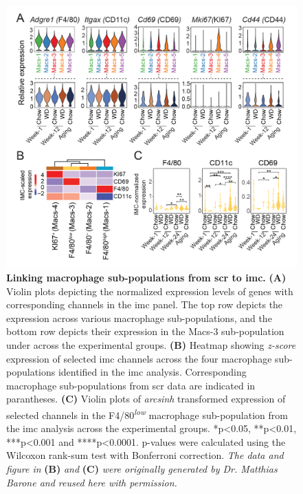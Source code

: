 \begin{figure}[t!]
\centering
\includegraphics[width=\linewidth]{Chapter4/Fig/F2-4-01.png}
\caption[Linking macrophage sub-populations from  to ]{\textbf{Linking macrophage sub-populations from \gls{scr} to \gls{imc}.} \textbf{(A)} Violin plots depicting the normalized expression levels of genes with corresponding channels in the \gls{imc} panel. The top row depicts the expression across various macrophage sub-populations, and the bottom row depicts their expression in the Macs-3 sub-population under across the experimental groups. \textbf{(B)} Heatmap showing \textit{z-score} expression of selected \gls{imc} channels across the four macrophage sub-populations identified in the \gls{imc} analysis. Corresponding macrophage sub-populations from \gls{scr} data are indicated in parantheses. \textbf{(C)} Violin plots of \textit{arcsinh} transformed expression of selected channels in the F4/80\textsuperscript{\textit{low}} macrophage sub-population from the \gls{imc} analysis across the experimental groups. *p<0.05, **p<0.01, ***p<0.001 and ****p<0.0001. p-values were calculated using the Wilcoxon rank-sum test with Bonferroni correction. \textit{The data and figure in } \textbf{(B)} \textit{and} \textbf{(C)} \textit{were originally generated by Dr. Matthias Barone and reused here with permission.}}
\label{fig:chp2_scrna_macrophages_imc}
\end{figure}




